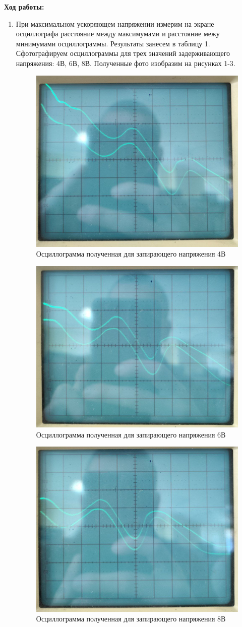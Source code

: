 \documentclass[a4paper, 12pt]{article}%
\begin{document}
	\textbf{Ход работы: }\\
	\begin{enumerate}
	

	\item При максимальном ускоряющем напряжении измерим на экране осциллографа расстояние между максимумами и расстояние межу минимумами осциллограммы. Результаты занесем в таблицу 1. Сфотографируем осциллограммы для трех значений задерживающего напряжения: 4В, 6В, 8В. Полученные фото изобразим на рисунках 1-3.
	
	\begin{figure}[H]
		\centering
		\includegraphics[width=0.6\linewidth]{4v_}
		\caption{Осциллограмма полученная для запирающего напряжения 4В}
	\end{figure}

	\begin{figure}[H]
		\centering
		\includegraphics[width=0.6\linewidth]{6v_}
		\caption{Осциллограмма полученная для запирающего напряжения 6В}
	\end{figure}

	\begin{figure}[H]
		\centering
		\includegraphics[width=0.6\linewidth]{8v_}
		\caption{Осциллограмма полученная для запирающего напряжения 8В}
	\end{figure}
	

\end{enumerate}
\end{document}
